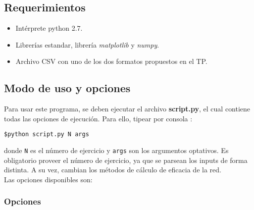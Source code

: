 \subsection{Requerimientos}
\begin{itemize}
\item Intérprete python 2.7.
\item Librerías estandar, librería \textit{matplotlib} y \textit{numpy}.
\item Archivo CSV con uno de los dos formatos propuestos en el TP. 
\end{itemize}

\subsection{Modo de uso y opciones}
Para usar este programa, se deben ejecutar el archivo \textbf{script.py}, el cual contiene todas las opciones de ejecución. Para ello, tipear por consola :

\texttt{\$python script.py N args}

donde \texttt{N} es el número de ejercicio y \texttt{args} son los argumentos optativos. Es obligatorio proveer el número de ejercicio, ya que se parsean los inputs de forma distinta. A su vez, cambian los métodos de cálculo de eficacia de la red.\\

Las opciones disponibles son:

\subsubsection{Opciones}






